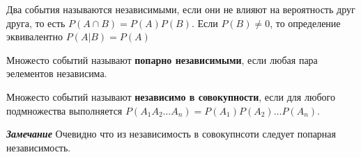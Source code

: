 Два события называются независимыми, если они не влияют на вероятность друг
друга, то есть $P(A \cap B) = P(A)P(B)$. Если  $P(B) \neq 0$, то определение эквивалентно $P(A | B) = P(A)$

Множесто событий называют \textbf{попарно независимыми}, если любая пара эелементов
независима.

Множесто событий называют \textbf{независимо в совокупности}, если для любого
подмножества выполняется $P(A_1A_2\dots A_n)=P(A_1)P(A_2)\dots P(A_n)$.

\textbf{\textit{Замечание}} Очевидно что из независимость в совокупнсоти
следует попарная независимость.
